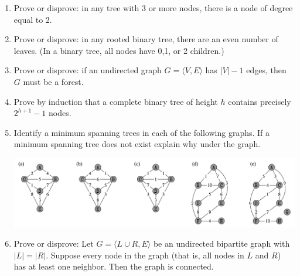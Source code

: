 \documentclass[11pt, oneside]{article}   	%
\begin{document}
\begin{enumerate}
\item Prove or disprove: in any tree with 3 or more nodes, there is a node of degree equal to 2.
\item Prove or disprove: in any rooted binary tree, there are an even number of leaves. (In a binary tree, all nodes have 0,1, or 2 children.)
\item Prove or disprove: if an undirected graph $G=\langle V,E\rangle$ has $|V|-1$ edges, then $G$ must be a forest.
\item Prove by induction that a complete binary tree of height $h$ contains precisely $2^{h+1}-1$ nodes.

\item Identify a minimum spanning trees in each of the following graphs. 
If a minimum spanning tree does not exist explain why under the graph.
\begin{center}
\hspace{-3em}\includegraphics[width=\textwidth]{DS2-CH11-MST}
\end{center}


\item Prove or disprove: 
Let $G=\langle L\cup R,E\rangle$ be an undirected bipartite graph with $|L|=|R|$. 
Suppose every node in the graph (that is, all nodes in $L$ and $R$) has at least one neighbor. 
Then the graph is connected. 



\end{enumerate}
\end{document}
